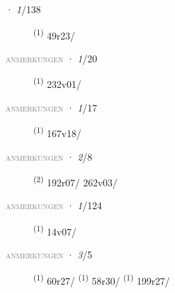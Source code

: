 \noindent{} · \textit{1}/138 \LEMMALINE
\begin{description}
    \item[]  \textsuperscript{(1)} \mbox{49r23/}
\end{description}
\textsc{\textcolor{gray}{anmerkungen}}
\ENTRYEND
\noindent{} · \textit{1}/20 \LEMMALINE
\begin{description}
    \item[]  \textsuperscript{(1)} \mbox{232v01/}
\end{description}
\textsc{\textcolor{gray}{anmerkungen}}
\ENTRYEND
\noindent{} · \textit{1}/17 \LEMMALINE
\begin{description}
    \item[]  \textsuperscript{(1)} \mbox{167v18/}
\end{description}
\textsc{\textcolor{gray}{anmerkungen}}
\ENTRYEND
\noindent{} · \textit{2}/8 \LEMMALINE
\begin{description}
    \item[]  \textsuperscript{(2)} \mbox{192r07/} \mbox{262v03/}
\end{description}
\textsc{\textcolor{gray}{anmerkungen}}
\ENTRYEND
\noindent{} · \textit{1}/124 \LEMMALINE
\begin{description}
    \item[]  \textsuperscript{(1)} \mbox{14v07/}
\end{description}
\textsc{\textcolor{gray}{anmerkungen}}
\ENTRYEND
\noindent{} · \textit{3}/5 \LEMMALINE
\begin{description}
    \item[]  \textsuperscript{(1)} \mbox{60r27/} \CASEBREAK {} \textsuperscript{(1)} \mbox{58r30/} \textsuperscript{(1)} \mbox{199r27/}
\end{description}
